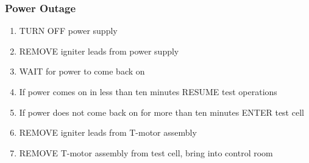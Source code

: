\subsubsection*{Power Outage}
\begin{enumerate}
    \item TURN OFF power supply
     \item REMOVE igniter leads from power supply
     \item WAIT for power to come back on
     \item If power comes on in less than ten minutes RESUME test operations
     \item If power does not come back on for more than ten minutes ENTER test cell
     \item REMOVE igniter leads from T-motor assembly
     \item REMOVE T-motor assembly from test cell, bring into control room
\end{enumerate}
